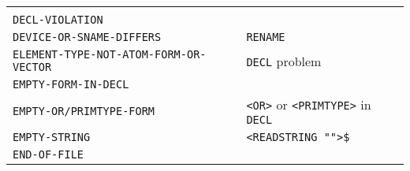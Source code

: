 \documentclass[a4paper]{scrbook}
\begin{document}
\begin{longtable}[]{@{}ll@{}}
\begin{minipage}[t]{0.36\columnwidth}
\strut
\end{minipage}\tabularnewline
\begin{minipage}[t]{0.58\columnwidth}\raggedright\strut
\texttt{DECL-VIOLATION}\strut
\end{minipage} & \begin{minipage}[t]{0.36\columnwidth}\raggedright\strut
\strut
\end{minipage}\tabularnewline
\begin{minipage}[t]{0.58\columnwidth}\raggedright\strut
\texttt{DEVICE-OR-SNAME-DIFFERS}\strut
\end{minipage} & \begin{minipage}[t]{0.36\columnwidth}\raggedright\strut
\texttt{RENAME}\strut
\end{minipage}\tabularnewline
\begin{minipage}[t]{0.58\columnwidth}\raggedright\strut
\texttt{ELEMENT-TYPE-NOT-ATOM-FORM-OR-VECTOR}\strut
\end{minipage} & \begin{minipage}[t]{0.36\columnwidth}\raggedright\strut
\texttt{DECL} problem\strut
\end{minipage}\tabularnewline
\begin{minipage}[t]{0.58\columnwidth}\raggedright\strut
\texttt{EMPTY-FORM-IN-DECL}\strut
\end{minipage} & \begin{minipage}[t]{0.36\columnwidth}\raggedright\strut
\strut
\end{minipage}\tabularnewline
\begin{minipage}[t]{0.58\columnwidth}\raggedright\strut
\texttt{EMPTY-OR/PRIMTYPE-FORM}\strut
\end{minipage} & \begin{minipage}[t]{0.36\columnwidth}\raggedright\strut
\texttt{\textless{}OR\textgreater{}} or \texttt{\textless{}PRIMTYPE\textgreater{}} in \texttt{DECL}\strut
\end{minipage}\tabularnewline
\begin{minipage}[t]{0.58\columnwidth}\raggedright\strut
\texttt{EMPTY-STRING}\strut
\end{minipage} & \begin{minipage}[t]{0.36\columnwidth}\raggedright\strut
\texttt{\textless{}READSTRING\ ""\textgreater{}\$}\strut
\end{minipage}\tabularnewline
\begin{minipage}[t]{0.58\columnwidth}\raggedright\strut
\texttt{END-OF-FILE}\strut
\end{minipage} & \begin{minipage}[t]{0.36\columnwidth}\raggedright\strut

\end{minipage}
\end{longtable}
\end{document}
